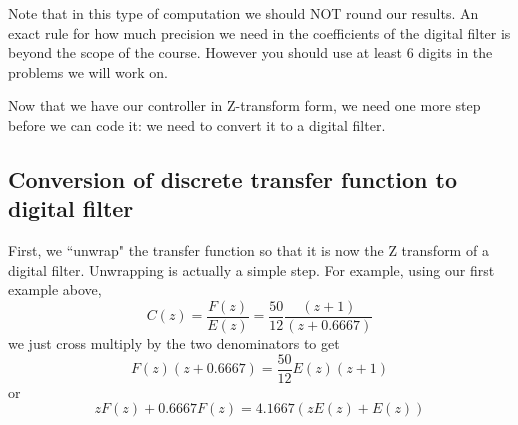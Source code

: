 %
%
%
%
%
%
%
%
%
%
%
%
%
%
%
%
%
%


Note that in this type of computation we should NOT round our results.  An exact rule for how
much precision we need in the coefficients of the digital filter is beyond the scope of the
course.  However you should use at least 6 digits in the problems we will work on.

Now that we have our controller in Z-transform form, we need one more step before we can code it: we need to convert it to a digital filter.

\subsection{Conversion of discrete transfer function to digital filter}

First, we ``unwrap" the transfer function so that it is now the Z transform of a digital filter.  Unwrapping is actually a simple step.  For example, using our first example above,
\[
C(z) = \frac{F(z)}{E(z)} = \frac{50}{12}\frac{(z+1)}{(z+0.6667)}
\]
we just cross multiply by the two denominators to get
\[
F(z) (z+0.6667) = \frac{50}{12} E(z) (z+1)
\]
or
\[
zF(z)+0.6667F(z) = 4.1667 (z E(z) + E(z))
\]

